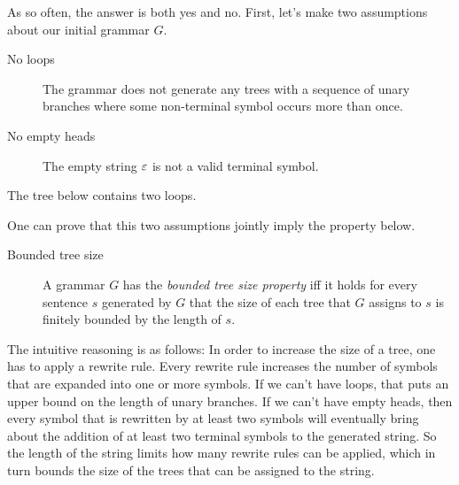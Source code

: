 As so often, the answer is both yes and no.
First, let's make two assumptions about our initial grammar $G$.
%
\begin{description}
    \item[No loops] The grammar does not generate any trees with a sequence of unary branches where some non-terminal symbol occurs more than once.
    \item[No empty heads] The empty string $\varepsilon$ is not a valid terminal symbol.
\end{description}
%
\begin{examplebox}
    The tree below contains two loops.
    \begin{center}
    \end{center}
\end{examplebox}
%
One can prove that this two assumptions jointly imply the property below.
%
\begin{description}
    \item[Bounded tree size] A grammar $G$ has the \emph{bounded tree size property} iff it holds for every sentence $s$ generated by $G$ that the size of each tree that $G$ assigns to $s$ is finitely bounded by the length of $s$.
\end{description}
%
The intuitive reasoning is as follows:
In order to increase the size of a tree, one has to apply a rewrite rule.
Every rewrite rule increases the number of symbols that are expanded into one or more symbols.
If we can't have loops, that puts an upper bound on the length of unary branches.
If we can't have empty heads, then every symbol that is rewritten by at least two symbols will eventually bring about the addition of at least two terminal symbols to the generated string.
So the length of the string limits how many rewrite rules can be applied, which in turn bounds the size of the trees that can be assigned to the string.


